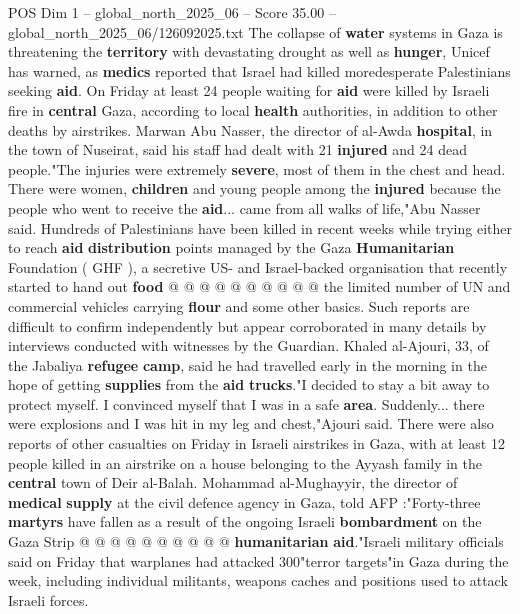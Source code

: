 \begin{textsample}{POS Dim 1 – global\_north\_2025\_06 – Score 35.00 – global\_north\_2025\_06/126092025.txt}  \label{ex:f1_pos_303}
The collapse of \textbf{water} systems in Gaza is threatening the \textbf{territory} with devastating drought as well as \textbf{hunger}, Unicef has warned, as \textbf{medics} reported that Israel had killed moredesperate Palestinians seeking \textbf{aid}.
On Friday at least 24 people waiting for \textbf{aid} were killed by Israeli fire in \textbf{central} Gaza, according to local \textbf{health} authorities, in addition to other deaths by airstrikes.
Marwan Abu Nasser, the director of al-Awda \textbf{hospital}, in the town of Nuseirat, said his staff had dealt with 21 \textbf{injured} and 24 dead people."The injuries were extremely \textbf{severe}, most of them in the chest and head.
There were women, \textbf{children} and young people among the \textbf{injured} because the people who went to receive the \textbf{aid}... came from all walks of life,"Abu Nasser said.
Hundreds of Palestinians have been killed in recent weeks while trying either to reach \textbf{aid} \textbf{distribution} points managed by the Gaza \textbf{Humanitarian} Foundation ( GHF ), a secretive US- and Israel-backed organisation that recently started to hand out \textbf{food} @ @ @ @ @ @ @ @ @ @ the limited number of UN and commercial vehicles carrying \textbf{flour} and some other basics.
Such reports are difficult to confirm independently but appear corroborated in many details by interviews conducted with witnesses by the Guardian.
Khaled al-Ajouri, 33, of the Jabaliya \textbf{refugee} \textbf{camp}, said he had travelled early in the morning in the hope of getting \textbf{supplies} from the \textbf{aid} \textbf{trucks}."I decided to stay a bit away to protect myself.
I convinced myself that I was in a safe \textbf{area}.
Suddenly... there were explosions and I was hit in my leg and chest,"Ajouri said.
There were also reports of other casualties on Friday in Israeli airstrikes in Gaza, with at least 12 people killed in an airstrike on a house belonging to the Ayyash family in the \textbf{central} town of Deir al-Balah.
Mohammad al-Mughayyir, the director of \textbf{medical} \textbf{supply} at the civil defence agency in Gaza, told AFP :"Forty-three \textbf{martyrs} have fallen as a result of the ongoing Israeli \textbf{bombardment} on the Gaza Strip @ @ @ @ @ @ @ @ @ @ \textbf{humanitarian} \textbf{aid}."Israeli military officials said on Friday that warplanes had attacked 300"terror targets"in Gaza during the week, including individual militants, weapons caches and positions used to attack Israeli forces.

\end{textsample}
